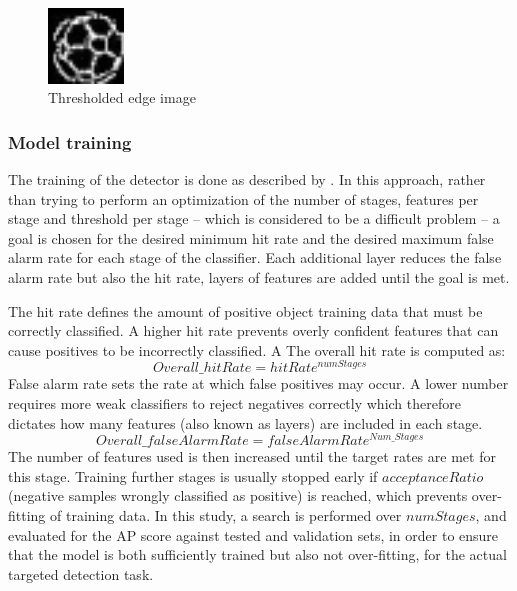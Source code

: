 \documentclass[a4paper,twoside,12pt]{report}
\begin{document}
\begin{figure}[h!]
\begin{center}
\includegraphics[width=2cm]{images/edge32.png}
\caption{Thresholded edge image}
\label{fig:edgeball}
\end{center}
\end{figure}

\subsubsection{Model training}

The training of the detector is done as described by \cite{vjdet}. In this approach, rather than trying to perform an optimization of the number of stages, features per stage and threshold per stage -- which is considered to be a difficult problem -- a goal is chosen for the desired minimum hit rate and the desired maximum false alarm rate for each stage of the classifier. Each additional layer reduces the false alarm rate but also the hit rate, layers of features are added until the goal is met.

The hit rate defines the amount of positive object training data that must be correctly classified. A higher hit rate prevents overly confident features that can cause positives to be incorrectly classified. A  The overall hit rate is computed as:
\begin{equation}
Overall\_hitRate = hitRate^{numStages}
\end{equation}
False alarm rate sets the rate at which false positives may occur. A lower number requires more weak classifiers to reject negatives correctly which therefore dictates how many features (also known as layers) are included in each stage. 
\begin{equation}
Overall\_falseAlarmRate = falseAlarmRate^{Num\_Stages}
\end{equation}
The number of features used is then increased until the target rates are met for this stage. Training further stages is usually stopped early if $acceptanceRatio$ (negative samples wrongly classified as positive) is reached, which prevents over-fitting of training data. In this study, a search is performed over $numStages$, and evaluated for the AP score against tested and validation sets, in order to ensure that the model is both sufficiently trained but also not over-fitting, for the actual targeted detection task.  
\end{document}

